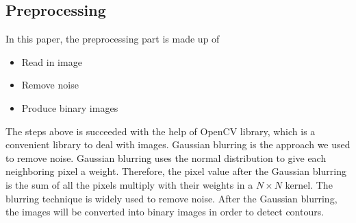 \documentclass[a4paper,twoside]{article}
\begin{document}
\subsection{Preprocessing}
In this paper, the preprocessing part is made up of 
\begin{itemize}
    \item Read in image
    \item Remove noise
    \item Produce binary images
\end{itemize}
The steps above is succeeded with the help of OpenCV library, which is a convenient library to deal with images.
Gaussian blurring is the approach we used to remove noise. Gaussian blurring uses the normal distribution to give each neighboring pixel a weight. Therefore, the pixel value after the Gaussian blurring is the sum of all the pixels multiply with their weights in a $N\times N$ kernel. The blurring technique is widely used to remove noise.
After the Gaussian blurring, the images will be converted into binary images in order to detect contours.
\end{document}
